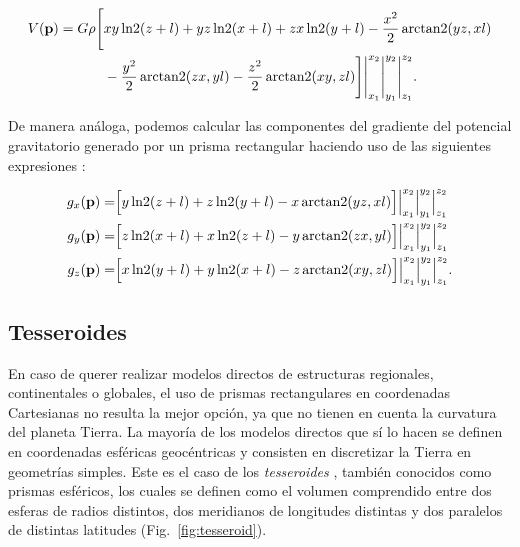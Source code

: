 \begin{equation}
    \begin{split}
        V(\mathbf{p}) =
        G \rho
        \Bigg[ &
            xy \operatorname{ln2} (z + l)
            + yz \operatorname{ln2}(x + l)
            + zx \operatorname{ln2}(y + l)
           - \frac{x^2}{2} \operatorname{arctan2}(yz, xl)
                \\&
           - \frac{y^2}{2} \operatorname{arctan2}(zx, yl)
           - \frac{z^2}{2} \operatorname{arctan2}(xy, zl)
        \Bigg]
        \Bigg|_{x_1}^{x_2}
        \Bigg|_{y_1}^{y_2}
        \Bigg|_{z_1}^{z_2}.
    \end{split}
    \label{eq:potencial-prismas-numerico}
\end{equation}

De manera análoga, podemos calcular las componentes del gradiente del potencial
gravitatorio generado por un prisma rectangular haciendo uso de las siguientes
expresiones \citep{nagy2000,nagy2002}:

\begin{align}
    g_x(\mathbf{p}) =&
        \Big[
            y \operatorname{ln2}(z + l) + z \operatorname{ln2}(y + l)  - x \operatorname{arctan2}(yz, xl)
        \Big]
        \Big|_{x_1}^{x_2}
        \Big|_{y_1}^{y_2}
        \Big|_{z_1}^{z_2} \\
    g_y(\mathbf{p}) =&
        \Big[
            z \operatorname{ln2}(x + l) + x \operatorname{ln2}(z + l)  - y \operatorname{arctan2}(zx, yl)
        \Big]
        \Big|_{x_1}^{x_2}
        \Big|_{y_1}^{y_2}
        \Big|_{z_1}^{z_2} \\
    g_z(\mathbf{p}) =&
        \Big[
            x \operatorname{ln2}(y + l) + y \operatorname{ln2}(x + l) - z \operatorname{arctan2}(xy, zl)
        \Big]
        \Big|_{x_1}^{x_2}
        \Big|_{y_1}^{y_2}
        \Big|_{z_1}^{z_2}.
\end{align}


\subsection{Tesseroides}

En caso de querer realizar modelos directos de estructuras regionales,
continentales o globales, el uso de prismas rectangulares en coordenadas
Cartesianas no resulta la mejor opción, ya que no tienen en cuenta la curvatura
del planeta Tierra.
La mayoría de los modelos directos que sí lo hacen se definen en coordenadas
esféricas geocéntricas y consisten en discretizar la Tierra en geometrías
simples.
Este es el caso de los \emph{tesseroides} \citep{anderson1976}, también
conocidos como prismas esféricos, los cuales se definen como el volumen
comprendido entre dos esferas de radios distintos, dos meridianos de longitudes
distintas y dos paralelos de distintas latitudes (Fig.~\ref{fig:tesseroid}).

